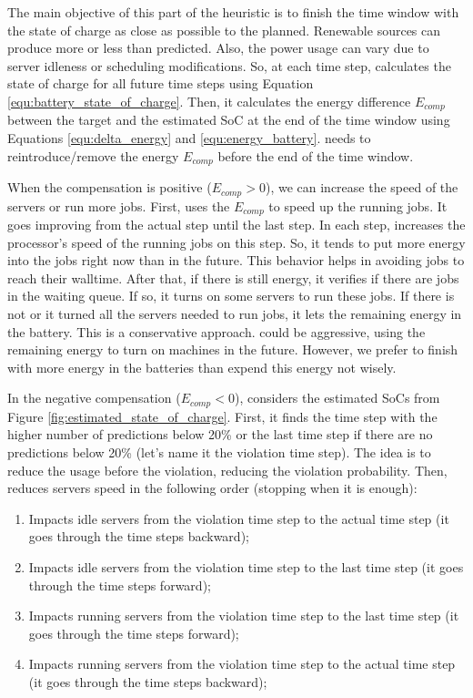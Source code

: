 The main objective of this part of the heuristic is to finish the time window with the state of charge as close as possible to the planned. Renewable sources can produce more or less than predicted. Also, the power usage can vary due to server idleness or scheduling modifications. So, at each time step, \emph{\systemName} calculates the state of charge for all future time steps using Equation \ref{equ:battery_state_of_charge}. Then, it calculates the energy difference $E_{comp}$ between the target and the estimated SoC at the end of the time window using Equations \ref{equ:delta_energy} and \ref{equ:energy_battery}. \emph{\systemName} needs to reintroduce/remove the energy $E_{comp}$ before the end of the time window.

When the compensation is positive ($E_{comp}>0$), we can increase the speed of the servers or run more jobs. First, \emph{\systemName} uses the $E_{comp}$ to speed up the running jobs. It goes improving from the actual step until the last step. In each step, \emph{\systemName} increases the processor's speed of the running jobs on this step. So, it tends to put more energy into the jobs right now than in the future. This behavior helps in avoiding jobs to reach their walltime. After that, if there is still energy, it verifies if there are jobs in the waiting queue. If so, it turns on some servers to run these jobs. If there is not or it turned all the servers needed to run jobs, it lets the remaining energy in the battery. This is a conservative approach. \emph{\systemName} could be aggressive, using the remaining energy to turn on machines in the future. However, we prefer to finish with more energy in the batteries than expend this energy not wisely.

In the negative compensation ($E_{comp}<0$), \emph{\systemName} considers the estimated SoCs from Figure \ref{fig:estimated_state_of_charge}. First, it finds the time step with the higher number of predictions below 20\% or the last time step if there are no predictions below 20\% (let's name it the violation time step). The idea is to reduce the usage before the violation, reducing the violation probability. Then, \emph{\systemName} reduces servers speed in the following order (stopping when it is enough):
\begin{enumerate}
    \item Impacts idle servers from the violation time step to the actual time step (it goes through the time steps backward);
    \item Impacts idle servers from the violation time step to the last time step (it goes through the time steps forward);
    \item Impacts running servers from the violation time step to the last time step (it goes through the time steps forward);
    \item Impacts running servers from the violation time step to the actual time step (it goes through the time steps backward);
\end{enumerate}

